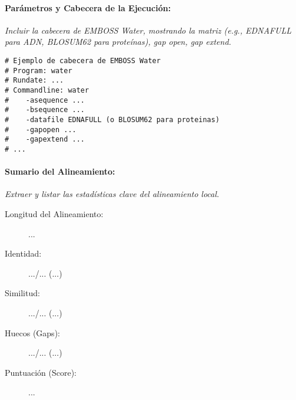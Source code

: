 \documentclass[fleqn,10pt]{article}
\begin{document}
    \paragraph{Parámetros y Cabecera de la Ejecución:}
    \textit{Incluir la cabecera de EMBOSS Water, mostrando la matriz (e.g., EDNAFULL para ADN, BLOSUM62 para proteínas), gap open, gap extend.}
    \begin{lstlisting}[style=outputstyle, caption={Cabecera del resultado de EMBOSS Water (ejemplo)}, basicstyle=\ttfamily\tiny, columns=flexible]
# Ejemplo de cabecera de EMBOSS Water
# Program: water
# Rundate: ...
# Commandline: water
#    -asequence ...
#    -bsequence ...
#    -datafile EDNAFULL (o BLOSUM62 para proteinas)
#    -gapopen ...
#    -gapextend ...
# ...
    \end{lstlisting}

    \paragraph{Sumario del Alineamiento:}
    \textit{Extraer y listar las estadísticas clave del alineamiento local.}
    \begin{description}
        \item[Longitud del Alineamiento:] ...
        \item[Identidad:] .../... (...)
        \item[Similitud:] .../... (...)
        \item[Huecos (Gaps):] .../... (...)
        \item[Puntuación (Score):] ...
    \end{description}
\end{document}
